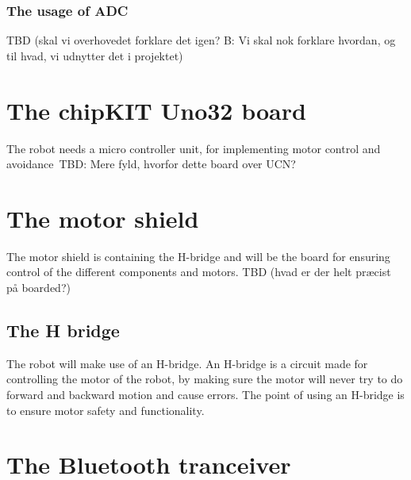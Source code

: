 \subsubsection{The usage of ADC}
TBD (skal vi overhovedet forklare det igen? B: Vi skal nok forklare hvordan, og til hvad, vi udnytter det i projektet)
\section{The chipKIT Uno32 board}
The robot needs a micro controller unit, for implementing motor control and avoidance\
TBD: Mere fyld, hvorfor dette board over UCN?

\section{The motor shield}
The motor shield is containing the H-bridge and will be the board for ensuring control of the different components and motors.
TBD (hvad er der helt præcist på boarded?)

\subsection{The H bridge}
The robot will make use of an H-bridge. An H-bridge is a circuit made for controlling the motor of the robot, by making sure the motor will never try to do forward and backward motion  and cause errors. The point of using an H-bridge is to ensure motor safety and functionality.

\section{The Bluetooth tranceiver}

